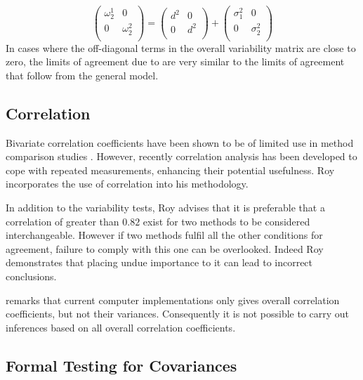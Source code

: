 \documentclass[12pt, a4paper]{report}
\theoremstyle{plain}
\theoremstyle{definition}
\theoremstyle{remark}
\begin{document}
\[\left(\begin{array}{cc}
\omega^1_2  & 0 \\
0 & \omega^2_2 \\
\end{array}  \right)
=  \left(
\begin{array}{cc}
d^2  & 0 \\
0 & d^2 \\
\end{array} \right)+
\left(
\begin{array}{cc}
\sigma^2_1  & 0 \\
0 & \sigma^2_2 \\
\end{array}\right)
\]
In cases where the off-diagonal terms in the overall variability
matrix are close to zero, the limits of agreement due to \citet{BXC2008} are very similar to the limits of agreement that follow from the general model.











\subsection{Correlation}	
Bivariate correlation coefficients have been shown to be of
limited use in method comparison studies \citep{BA86}. However,
recently correlation analysis has been developed to cope with
repeated measurements, enhancing their potential usefulness. Roy
incorporates the use of correlation into his methodology.


In addition to the variability tests, Roy advises that it is preferable that a correlation of greater than $0.82$ exist for two methods to be considered interchangeable. However if two methods fulfil all the other conditions for agreement, failure to comply with this one can be overlooked. Indeed Roy demonstrates that placing undue importance to it can lead to incorrect conclusions. 

\citet{ARoy2009} remarks that current computer implementations only gives overall correlation coefficients, but not their variances. Consequently it is not possible to carry out inferences based on all overall correlation coefficients.
	\subsection{Formal Testing for Covariances} %
	
\end{document}
